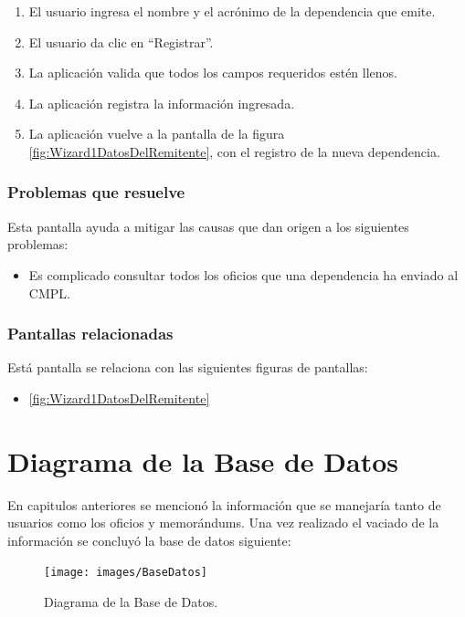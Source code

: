 	\begin{enumerate}
		\item El usuario ingresa el nombre y el acrónimo de la dependencia que emite.
		\item El usuario da clic en ``Registrar''.
		\item La aplicación valida que todos los campos requeridos estén llenos.
		\item La aplicación registra la información ingresada.
		\item La aplicación vuelve a la pantalla de la figura \ref{fig:Wizard1DatosDelRemitente}, con el registro de la nueva dependencia.
	\end{enumerate}

\subsubsection{Problemas que resuelve}
Esta pantalla ayuda a mitigar las causas que dan origen a los siguientes problemas:

	\begin{itemize}
		\item Es complicado consultar todos los oficios que una dependencia ha enviado al CMPL.
	\end{itemize}

\subsubsection{Pantallas relacionadas}
Está pantalla se relaciona con las siguientes figuras de pantallas:
	\begin{itemize}
		\item \ref{fig:Wizard1DatosDelRemitente}
	\end{itemize}

\section{Diagrama de la Base de Datos}

	En capitulos anteriores se mencionó la información que se manejaría tanto de usuarios como los oficios y memorándums. Una vez realizado el vaciado de la información se concluyó la base de datos siguiente: \\ 
	
	\begin{figure}[htbp!]
		\centering
			\texttt{[image: images/BaseDatos]}
		\caption{Diagrama de la Base de Datos.}
		\label{diagrama de base de datos}
	\end{figure}